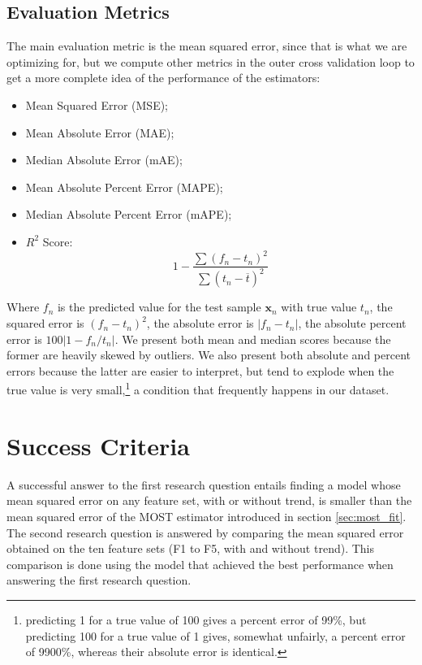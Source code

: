 \documentclass[a4paper]{book}
\begin{document}
\subsection{Evaluation Metrics}
The main evaluation metric is the mean squared error, since that is what we are optimizing for, but we compute other metrics in the outer cross validation loop to get a more complete idea of the performance of the estimators:

\begin{itemize}
\item Mean Squared Error (MSE);
\item Mean Absolute Error (MAE);
\item Median Absolute Error (mAE);
\item Mean Absolute Percent Error (MAPE);
\item Median Absolute Percent Error (mAPE);
\item $R^2$ Score:
$$
1-\frac{\sum (f_n-t_n)^2}{\sum (t_n-\overline{t})^2}
$$
\end{itemize}

Where $f_n$ is the predicted value for the test sample $\bm x_n$ with true value $t_n$, the squared error is $(f_n-t_n)^2$, the absolute error is $\vert f_n-t_n\vert$, the absolute percent error is $100\vert 1-f_n/t_n\vert$. We present both mean and median scores because the former are heavily skewed by outliers. We also present both absolute and percent errors because the latter are easier to interpret, but tend to explode when the true value is very small,\footnote{predicting 1 for a true value of 100 gives a percent error of 99\%, but predicting 100 for a true value of 1 gives, somewhat unfairly, a percent error of 9900\%, whereas their absolute error is identical.} a condition that frequently happens in our dataset.


\section{Success Criteria}
\label{sec:success}
A successful answer to the first research question entails finding a model whose mean squared error on any feature set, with or without trend, is smaller than the mean squared error of the MOST estimator introduced in section \ref{sec:most_fit}. The second research question is answered by comparing the mean squared error obtained on the ten feature sets (F1 to F5, with and without trend). This comparison is done using the model that achieved the best performance when answering the first research question.
\end{document}
